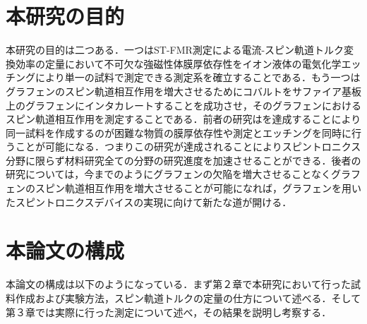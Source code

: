 \section{本研究の目的}
本研究の目的は二つある．一つはST-FMR測定による電流-スピン軌道トルク変換効率の定量において不可欠な強磁性体膜厚依存性をイオン液体の電気化学エッチングにより単一の試料で測定できる測定系を確立することである．もう一つはグラフェンのスピン軌道相互作用を増大させるためにコバルトをサファイア基板上のグラフェンにインタカレートすることを成功させ，そのグラフェンにおけるスピン軌道相互作用を測定することである．前者の研究はを達成することにより同一試料を作成するのが困難な物質の膜厚依存性や測定とエッチングを同時に行うことが可能になる．つまりこの研究が達成されることによりスピントロニクス分野に限らず材料研究全ての分野の研究進度を加速させることができる．後者の研究については，今までのようにグラフェンの欠陥を増大させることなくグラフェンのスピン軌道相互作用を増大させることが可能になれば，グラフェンを用いたスピントロニクスデバイスの実現に向けて新たな道が開ける．



\section{本論文の構成}
本論文の構成は以下のようになっている．まず第２章で本研究において行った試料作成および実験方法，スピン軌道トルクの定量の仕方について述べる．そして第３章では実際に行った測定について述べ，その結果を説明し考察する．




